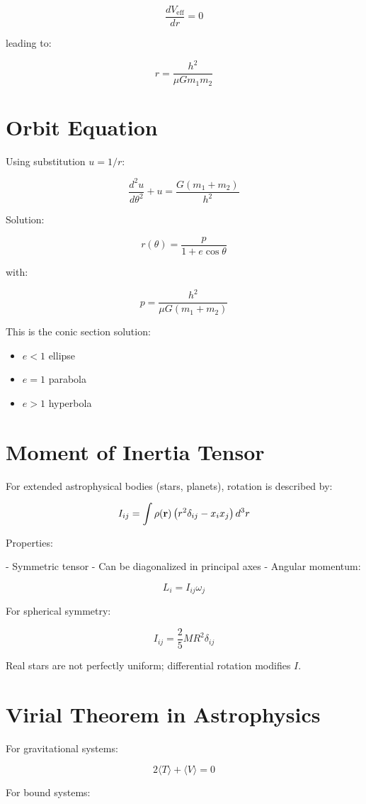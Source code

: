 \documentclass[14pt,a4paper]{article}
\begin{document}
\[
\frac{dV_{\text{eff}}}{dr} = 0
\]

leading to:

\[
r = \frac{h^2}{\mu G m_1 m_2}
\]

\section{Orbit Equation}

Using substitution $u = 1/r$:

\[
\frac{d^2 u}{d\theta^2} + u = \frac{G(m_1+m_2)}{h^2}
\]

Solution:

\[
r(\theta) = \frac{p}{1 + e\cos\theta}
\]

with:

\[
p = \frac{h^2}{\mu G (m_1+m_2)}
\]

This is the conic section solution:
\begin{itemize}
\item $e<1$ ellipse
\item $e=1$ parabola
\item $e>1$ hyperbola
\end{itemize}
\section{Moment of Inertia Tensor}

For extended astrophysical bodies (stars, planets), rotation is described by:

\[
I_{ij} = \int \rho(\vb{r})
\left( r^2 \delta_{ij} - x_i x_j \right) d^3 r
\]

Properties:

- Symmetric tensor
- Can be diagonalized in principal axes
- Angular momentum:

\[
L_i = I_{ij} \omega_j
\]

For spherical symmetry:

\[
I_{ij} = \frac{2}{5}MR^2 \delta_{ij}
\]

Real stars are not perfectly uniform; differential rotation modifies $I$.

\section{Virial Theorem in Astrophysics}

For gravitational systems:

\[
2\langle T \rangle + \langle V \rangle = 0
\]

For bound systems:
\end{document}
